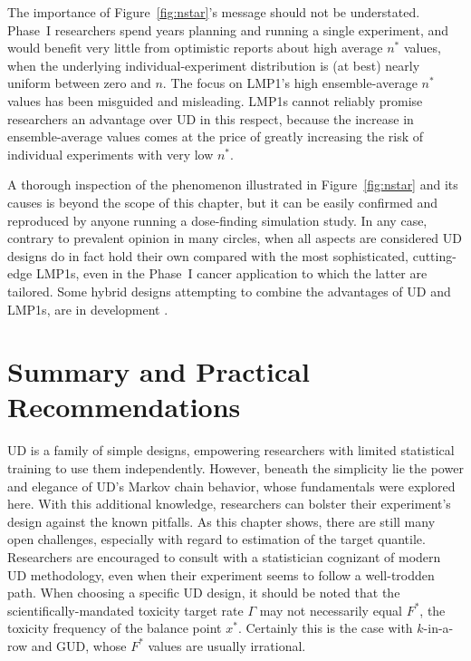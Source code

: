 The importance of Figure~\ref{fig:nstar}'s message  should not be understated.  Phase~I researchers spend years planning and running a single experiment, and would benefit very little from optimistic reports about high average $n^*$ values, when the underlying individual-experiment distribution is (at best) nearly uniform between zero and $n$. The focus on LMP1's high ensemble-average $n^*$ values has been misguided and misleading. LMP1s cannot reliably promise researchers an advantage over UD in this respect, because the increase in ensemble-average values comes at the price of greatly increasing the risk of individual experiments with very low $n^*$.

A thorough inspection of the phenomenon illustrated in Figure~\ref{fig:nstar} and its causes is beyond the scope of this chapter, but it can be easily confirmed and reproduced by anyone running a dose-finding simulation study. In any case, contrary to prevalent opinion in many circles, when all aspects are considered UD designs do in fact hold their own compared with the most sophisticated, cutting-edge LMP1s, even in the Phase~I cancer application to which the latter are tailored. Some hybrid designs attempting to combine the advantages of UD and LMP1s, are in development \citep[Ch.~5]{Oron07}.


\section{Summary and Practical Recommendations}\label{sec:summary}

UD is a family of simple designs, empowering researchers with limited statistical training to use them independently. However, beneath the simplicity lie the power and elegance of UD's Markov chain behavior, whose fundamentals were explored here. With this additional knowledge, researchers can bolster their experiment's design against the known pitfalls. As this chapter shows, there are still many open challenges, especially with regard to estimation of the target quantile. Researchers are encouraged to consult with a statistician cognizant of modern UD methodology, even when their experiment seems to follow a well-trodden path. When choosing a specific UD design, it should be noted that the scientifically-mandated toxicity target rate $\Gamma$ may not necessarily equal $F^*$, the toxicity frequency of the balance point $x^*$. Certainly this is the case with $k$-in-a-row and GUD, whose $F^*$ values are usually irrational.

